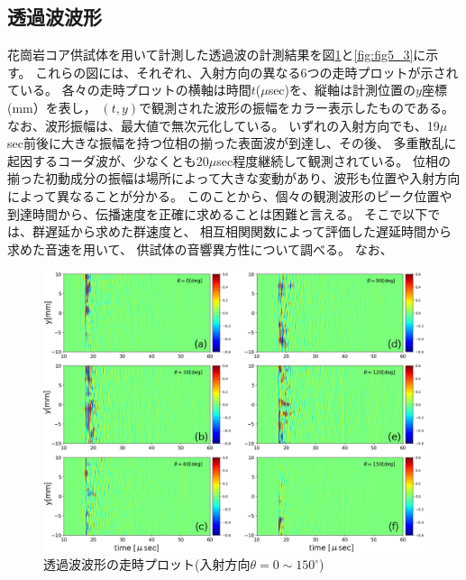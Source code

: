 \subsection{透過波波形}
花崗岩コア供試体を用いて計測した透過波の計測結果を図\ref{fig:fig5_2}と\ref{fig:fig5_3}に示す。
これらの図には、それぞれ、入射方向の異なる6つの走時プロットが示されている。
各々の走時プロットの横軸は時間$t$($\mu$sec)を、縦軸は計測位置の$y$座標(mm）を表し，
$(t,y)$で観測された波形の振幅をカラー表示したものである。
なお、波形振幅は、最大値で無次元化している。
いずれの入射方向でも、19$\mu$sec前後に大きな振幅を持つ位相の揃った表面波が到達し、その後、
多重散乱に起因するコーダ波が、少なくとも20$\mu$sec程度継続して観測されている。
位相の揃った初動成分の振幅は場所によって大きな変動があり、波形も位置や入射方向によって異なることが分かる。
このことから、個々の観測波形のピーク位置や到達時間から、伝播速度を正確に求めることは困難と言える。
そこで以下では、群遅延から求めた群速度と、
相互相関関数によって評価した遅延時間から求めた音速を用いて、
供試体の音響異方性について調べる。
なお、
\begin{figure}[h]
	\begin{center}
	\includegraphics[width=1.0\linewidth]{Figs/fig5_2.eps} 
	\end{center}
	\caption{
		透過波波形の走時プロット(入射方向$\theta=0\sim 150^{\circ}$)
	} 
	\label{fig:fig5_2}
\end{figure}
